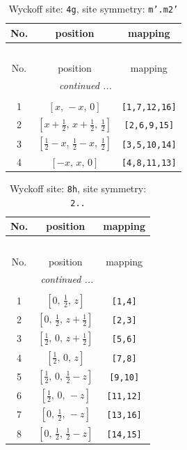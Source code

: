 \documentclass[fleqn,8pt]{jsarticle}
\begin{document}
\renewcommand{\arraystretch}{1.2}
\begin{longtable}{ccc}
\caption{Wyckoff site: {\tt 4g}, site symmetry: {\tt m'.m2'}}
 \\
 \hline \hline
No. & position & mapping \\ \hline \endfirsthead

\multicolumn{2}{l}{\tablename\ \thetable{}} \\
 \hline \hline
No. & position & mapping \\ \hline \endhead

 \hline \hline
\multicolumn{2}{r}{\footnotesize\it continued ...} \\ \endfoot

 \hline \hline
\multicolumn{2}{r}{} \\ \endlastfoot

1 & $\left[ x,\, - x,\, 0 \right]$ & {\tt [1,7,12,16]} \\ \hline
2 & $\left[ x + \frac{1}{2},\, x + \frac{1}{2},\, \frac{1}{2} \right]$ & {\tt [2,6,9,15]} \\ \hline
3 & $\left[ \frac{1}{2} - x,\, \frac{1}{2} - x,\, \frac{1}{2} \right]$ & {\tt [3,5,10,14]} \\ \hline
4 & $\left[ - x,\, x,\, 0 \right]$ & {\tt [4,8,11,13]} \\
\end{longtable}
\renewcommand{\arraystretch}{1.2}
\begin{longtable}{ccc}
\caption{Wyckoff site: {\tt 8h}, site symmetry: {\tt 2..}}
 \\
 \hline \hline
No. & position & mapping \\ \hline \endfirsthead

\multicolumn{2}{l}{\tablename\ \thetable{}} \\
 \hline \hline
No. & position & mapping \\ \hline \endhead

 \hline \hline
\multicolumn{2}{r}{\footnotesize\it continued ...} \\ \endfoot

 \hline \hline
\multicolumn{2}{r}{} \\ \endlastfoot

1 & $\left[ 0,\, \frac{1}{2},\, z \right]$ & {\tt [1,4]} \\ \hline
2 & $\left[ 0,\, \frac{1}{2},\, z + \frac{1}{2} \right]$ & {\tt [2,3]} \\ \hline
3 & $\left[ \frac{1}{2},\, 0,\, z + \frac{1}{2} \right]$ & {\tt [5,6]} \\ \hline
4 & $\left[ \frac{1}{2},\, 0,\, z \right]$ & {\tt [7,8]} \\ \hline
5 & $\left[ \frac{1}{2},\, 0,\, \frac{1}{2} - z \right]$ & {\tt [9,10]} \\ \hline
6 & $\left[ \frac{1}{2},\, 0,\, - z \right]$ & {\tt [11,12]} \\ \hline
7 & $\left[ 0,\, \frac{1}{2},\, - z \right]$ & {\tt [13,16]} \\ \hline
8 & $\left[ 0,\, \frac{1}{2},\, \frac{1}{2} - z \right]$ & {\tt [14,15]} \\
\end{longtable}
\end{document}

